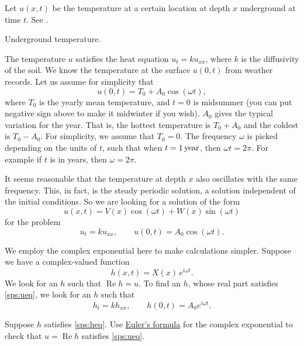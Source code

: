 Let $u(x,t)$ be the temperature at a certain location at depth $x$
underground at time $t$.  See .

\begin{mywrapfig}{2.65in}
\capstart
{}
\caption{Underground temperature.\label{sps:groundtempfig}}
\end{mywrapfig}

The temperature $u$ satisfies the heat equation $u_t = ku_{xx}$, where $k$
is the diffusivity of the soil.
We know the temperature at the surface $u(0,t)$ from weather
records.  Let us assume for simplicity that
\begin{equation*}
u(0,t) = T_0 + A_0 \cos (\omega t) ,
\end{equation*}
where $T_0$ is the yearly mean
temperature, and
$t=0$ is midsummer (you can put
negative sign above to make it midwinter if you wish).  $A_0$ gives 
the typical variation for the year.  That is,
the hottest temperature is $T_0 + A_0$ and the coldest is $T_0 - A_0$.
For simplicity, we assume that $T_0 = 0$.
The frequency $\omega$ is picked depending on the units of $t$, such that
when $t=\unit[1]{year}$, then $\omega t = 2 \pi$.  For example if $t$ is
in years, then $\omega = 2\pi$.

It seems reasonable that the temperature at depth $x$ also oscillates
with the same frequency.  This, in fact, is the steady periodic
solution, a solution independent of the initial conditions.
So we are looking for a solution of the form
\begin{equation*}
u(x,t) = V(x) \cos (\omega t) + W (x) \sin ( \omega t)
\end{equation*}
for the problem
\begin{equation} \label{sps:ueq}
u_t = k u_{xx}, \qquad u(0,t) = A_0 \cos ( \omega t) .
\end{equation}

We employ the complex exponential here to make calculations simpler.
Suppose we have a complex-valued function
\begin{equation*}
h(x,t) = X(x)\, e^{i\omega t} .
\end{equation*}
We look for an $h$ such that $\operatorname{Re} h = u$.
To find an $h$, whose real part satisfies \eqref{sps:ueq}, we look for
an $h$ such that
\begin{equation} \label{sps:heq}
h_t = k h_{xx}, \qquad h(0,t) = A_0 e^{i\omega t} .
\end{equation}

\begin{exercise}
Suppose $h$ satisfies \eqref{sps:heq}.
Use \hyperref[eulersformula]{Euler's formula} for the complex exponential to
check that $u = \operatorname{Re} h$ satisfies \eqref{sps:ueq}.
\end{exercise}

